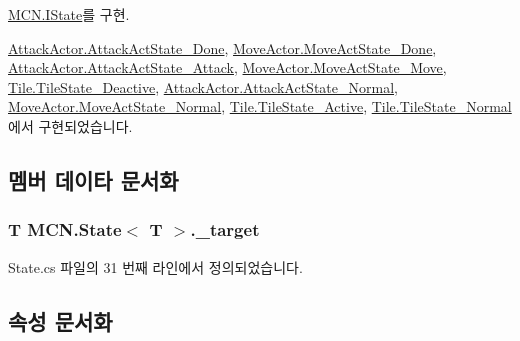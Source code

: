 \hyperlink{interface_m_c_n_1_1_i_state_a6345ae1392685098bacef30ddf80362e}{M\+C\+N.\+I\+State}를 구현.



\hyperlink{class_attack_actor_1_1_attack_act_state___done_a87dc9fe06b7132e7eff68fce885c2cd2}{Attack\+Actor.\+Attack\+Act\+State\+\_\+\+Done}, \hyperlink{class_move_actor_1_1_move_act_state___done_a50f24c5382008b0205b7d5280880600f}{Move\+Actor.\+Move\+Act\+State\+\_\+\+Done}, \hyperlink{class_attack_actor_1_1_attack_act_state___attack_a2755f4dae2cf1f80a94b6bcc973d1bfd}{Attack\+Actor.\+Attack\+Act\+State\+\_\+\+Attack}, \hyperlink{class_move_actor_1_1_move_act_state___move_a8eb57e77a4d5d6e1e0b2f6ccf8532d73}{Move\+Actor.\+Move\+Act\+State\+\_\+\+Move}, \hyperlink{class_tile_1_1_tile_state___deactive_a806c5dbc5eb43903ad41d448f3d25c61}{Tile.\+Tile\+State\+\_\+\+Deactive}, \hyperlink{class_attack_actor_1_1_attack_act_state___normal_a7d6644fed269325b8f62138d8adb50f5}{Attack\+Actor.\+Attack\+Act\+State\+\_\+\+Normal}, \hyperlink{class_move_actor_1_1_move_act_state___normal_ac679d09107c9471774c30ffc169b5ad0}{Move\+Actor.\+Move\+Act\+State\+\_\+\+Normal}, \hyperlink{class_tile_1_1_tile_state___active_ab53c7c818d65122d6d36c9681ca53bf9}{Tile.\+Tile\+State\+\_\+\+Active}, \hyperlink{class_tile_1_1_tile_state___normal_acf613382b6ddeff2fcc226d8caeb0b53}{Tile.\+Tile\+State\+\_\+\+Normal}에서 구현되었습니다.



\subsection{멤버 데이타 문서화}
\subsubsection[{\texorpdfstring{\+\_\+target}{_target}}]{\setlength{\rightskip}{0pt plus 5cm}T {\bf M\+C\+N.\+State}$<$ T $>$.\+\_\+target\hspace{0.3cm}{\ttfamily [private]}}\hypertarget{class_m_c_n_1_1_state_ab759357c7d076cf62dd0016b743d762e}{}\label{class_m_c_n_1_1_state_ab759357c7d076cf62dd0016b743d762e}


State.\+cs 파일의 31 번째 라인에서 정의되었습니다.



\subsection{속성 문서화}
